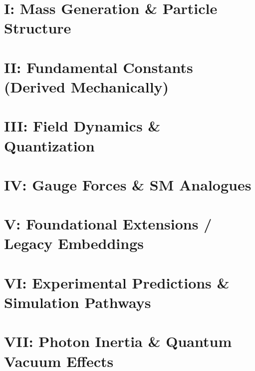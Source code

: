 \documentclass[12pt]{article}
\begin{document}
    \appendix
        \def\standalonechapter{false}
        \newpage\chapter*{I: Mass Generation \& Particle Structure}
        
        
        
        

        \newpage\chapter*{II: Fundamental Constants (Derived Mechanically)}
        
        
        
        
        
        

        \newpage\chapter*{III: Field Dynamics \& Quantization}
        

        \newpage\chapter*{IV: Gauge Forces \& SM Analogues}
        

        \newpage\chapter*{V: Foundational Extensions / Legacy Embeddings}
        

        \newpage\chapter*{VI: Experimental Predictions \& Simulation Pathways}
        

        \newpage\chapter*{VII: Photon Inertia \& Quantum Vacuum Effects}
        
        
        

    
    
\end{document}
